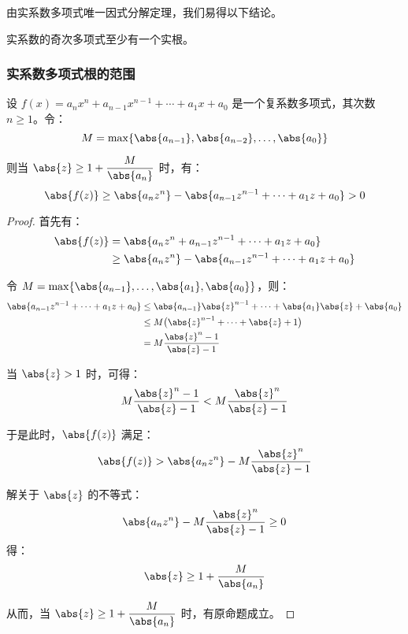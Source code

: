 由实系数多项式唯一因式分解定理，我们易得以下结论。

\begin{proposition}
	实系数的奇次多项式至少有一个实根。
\end{proposition}

\subsubsection{实系数多项式根的范围}

\begin{proposition}
	设 $f(x) = a_n x^n + a_{n - 1} x^{n - 1} + \cdots + a_1 x + a_0$ 是一个复系数多项式，其次数 $n \ge 1$。令：
	$$
	M = \max \{ \abs{a_{n - 1}}, \abs{a_{n - 2}}, \ldots, \abs{a_0} \}
	$$

	则当 $\abs{z} \ge 1 + \dfrac{M}{\abs{a_n}}$ 时，有：
	$$
	\abs{f(z)} \ge \abs{a_n z^n} - \abs{a_{n - 1} z^{n - 1} + \cdots + a_1 z + a_0} > 0
	$$
\end{proposition}

\begin{proof}
	首先有：
	$$
	\begin{aligned}
		\abs{f(z)} &= \abs{a_n z^n + a_{n - 1} z^{n - 1} + \cdots + a_1 z + a_0}
		\\&\ge
		\abs{a_n z^n} - \abs{a_{n - 1} z^{n - 1} + \cdots + a_1 z + a_0}
	\end{aligned}
	$$

	令 $M = \max \{ \abs{a_{n - 1}}, \ldots, \abs{a_1}, \abs{a_0} \}$，则：
	$$
	\begin{aligned}
		\abs{a_{n - 1} z^{n - 1} + \cdots + a_1 z + a_0} &\le \abs{a_{n - 1}} \abs{z}^{n - 1} + \cdots + \abs{a_1} \abs{z} + \abs{a_0}
		\\&\le
		M \bigl( \abs{z}^{n - 1} + \cdots + \abs{z} + 1 \bigr)
		\\&=
		M \dfrac{\abs{z}^n - 1}{\abs{z} - 1}
	\end{aligned}
	$$

	当 $\abs{z} > 1$ 时，可得：
	$$
	M \dfrac{\abs{z}^n - 1}{\abs{z} - 1} < M \dfrac{\abs{z}^n}{\abs{z} - 1}
	$$

	于是此时，$\abs{f(z)}$ 满足：
	$$
	\abs{f(z)} > \abs{a_n z^n} - M \dfrac{\abs{z}^n}{\abs{z} - 1}
	$$

	解关于 $\abs{z}$ 的不等式：
	$$
	\abs{a_n z^n} - M \dfrac{\abs{z}^n}{\abs{z} - 1} \ge 0
	$$
	得：
	$$
	\abs{z} \ge 1 + \dfrac{M}{\abs{a_n}}
	$$

	从而，当 $\abs{z} \ge 1 + \dfrac{M}{\abs{a_n}}$ 时，有原命题成立。
\end{proof}

